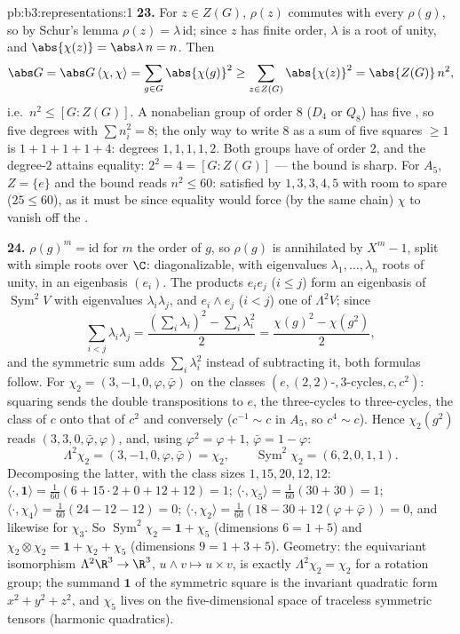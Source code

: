 \begin{solution}{pb:b3:representations:1}
\textbf{23.} For $z \in Z(G)$, $\rho(z)$ commutes with every
$\rho(g)$, so by Schur's lemma $\rho(z) = \lambda\,
\mathrm{id}$; since $z$ has finite order, $\lambda$ is a root
of unity, and $\abs{\chi(z)} = \abs\lambda\,n = n$. Then
\[
\abs G = \abs G\,\langle\chi, \chi\rangle
= \sum_{g \in G}\abs{\chi(g)}^2
\geq \sum_{z \in Z(G)}\abs{\chi(z)}^2
= \abs{Z(G)}\,n^2,
\]
i.e.\ $n^2 \leq [G : Z(G)]$. A nonabelian group of order $8$
($D_4$ or $Q_8$) has five , so five
 degrees with $\sum n_i^2 = 8$; the only way to
write $8$ as a sum of five squares $\geq 1$ is $1 + 1 + 1 + 1
+ 4$: degrees $1, 1, 1, 1, 2$. Both groups have  of
order $2$, and the degree-$2$  attains equality:
$2^2 = 4 = [G : Z(G)]$ --- the bound is sharp. For $A_5$,
$Z = \{e\}$ and the bound reads $n^2 \leq 60$: satisfied by
$1, 3, 3, 4, 5$ with room to spare ($25 \leq 60$), as it must
be since equality would force (by the same chain) $\chi$ to
vanish off the .

\textbf{24.} $\rho(g)^m = \mathrm{id}$ for $m$ the order of
$g$, so $\rho(g)$ is annihilated by $X^m - 1$, split with
simple roots over $\C$: diagonalizable, with eigenvalues
$\lambda_1, \dots, \lambda_n$ roots of unity, in an
eigenbasis $(e_i)$. The products $e_ie_j$ ($i \leq j$) form an
eigenbasis of $\operatorname{Sym}^2V$ with eigenvalues
$\lambda_i\lambda_j$, and $e_i \wedge e_j$ ($i < j$) one of
$\Lambda^2V$; since
\[
\sum_{i<j}\lambda_i\lambda_j
= \frac{(\sum_i\lambda_i)^2 - \sum_i\lambda_i^2}2
= \frac{\chi(g)^2 - \chi(g^2)}2,
\]
and the symmetric sum adds $\sum_i\lambda_i^2$ instead of
subtracting it, both formulas follow. For $\chi_2 = (3, -1,
0, \varphi, \bar\varphi)$ on the classes $(e, (2,2)\text{-},
3\text{-cycles}, c, c^2)$: squaring sends the double
transpositions to $e$, the three-cycles to three-cycles, the
class of $c$ onto that of $c^2$ and conversely ($c^{-1} \sim
c$ in $A_5$, so $c^4 \sim c$). Hence $\chi_2(g^2)$ reads $(3,
3, 0, \bar\varphi, \varphi)$, and, using $\varphi^2 = \varphi
+ 1$, $\bar\varphi = 1 - \varphi$:
\[
\Lambda^2\chi_2 = (3, -1, 0, \varphi, \bar\varphi) = \chi_2,
\qquad
\operatorname{Sym}^2\chi_2 = (6, 2, 0, 1, 1) .
\]
Decomposing the latter, with the class sizes $1, 15, 20, 12,
12$: $\langle\cdot, \mathbf 1\rangle = \frac1{60}(6 +
15\cdot2 + 0 + 12 + 12) = 1$; $\langle\cdot, \chi_5\rangle =
\frac1{60}(30 + 30) = 1$; $\langle\cdot, \chi_4\rangle =
\frac1{60}(24 - 12 - 12) = 0$; $\langle\cdot, \chi_2\rangle =
\frac1{60}(18 - 30 + 12(\varphi + \bar\varphi)) = 0$, and
likewise for $\chi_3$. So $\operatorname{Sym}^2\chi_2 =
\mathbf 1 + \chi_5$ (dimensions $6 = 1 + 5$) and
$\chi_2\otimes\chi_2 = \mathbf 1 + \chi_2 + \chi_5$
(dimensions $9 = 1 + 3 + 5$). Geometry: the equivariant
isomorphism $\Lambda^2\R^3 \to \R^3$, $u \wedge v \mapsto u
\times v$, is exactly $\Lambda^2\chi_2 = \chi_2$ for a
rotation group; the summand $\mathbf 1$ of the symmetric
square is the invariant quadratic form $x^2 + y^2 + z^2$, and
$\chi_5$ lives on the five-dimensional space of traceless
symmetric tensors (harmonic quadratics).


\end{solution}
